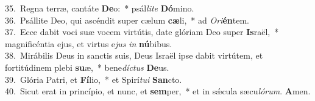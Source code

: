 {35.~}Regna terræ, cantáte \textbf{De}o:~* psál\textit{li}\textit{te} \textbf{Dó}mino.\\
{36.~}Psállite Deo, qui ascéndit super cælum \textbf{cæ}li,~* ad \textit{O}\textit{ri}\textbf{én}tem.\\
{37.~}Ecce dabit voci suæ vocem virtútis, date glóriam Deo super \textbf{Is}raël,~* magnificéntia ejus, et virtus e\textit{jus} \textit{in} \textbf{nú}bibus.\\
{38.~}Mirábilis Deus in sanctis suis, Deus Israël ipse dabit virtútem, et fortitúdinem plebi \textbf{su}æ,~* bene\textit{dí}\textit{ctus} \textbf{De}us.\\
{39.~}Glória Patri, et \textbf{Fí}lio,~* et Spirí\textit{tu}\textit{i} \textbf{San}cto.\\
{40.~}Sicut erat in princípio, et nunc, et \textbf{sem}per,~* et in sǽcula sæcu\textit{ló}\textit{rum}. \textbf{A}men.\\
